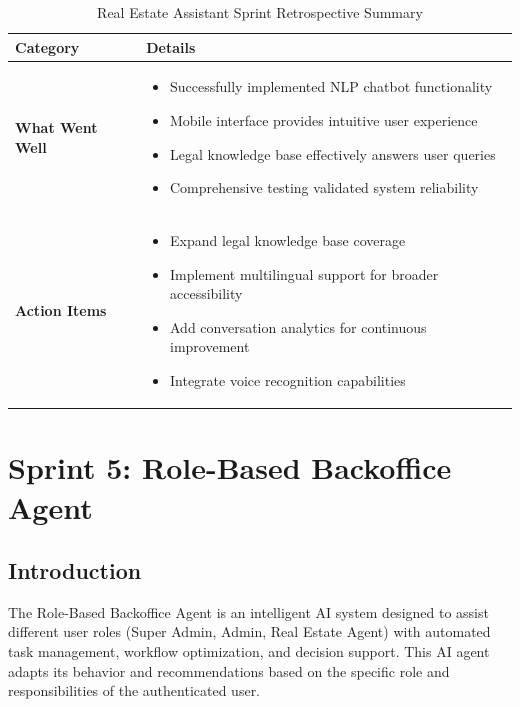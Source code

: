 \begin{table}[htbp]
    \centering
    \begin{tabular}{|p{3cm}|p{10cm}|}
        \hline
        \textbf{Category} & \textbf{Details} \\
        \hline
        \textbf{What Went Well} & 
        \begin{itemize}
            \item Successfully implemented NLP chatbot functionality
            \item Mobile interface provides intuitive user experience
            \item Legal knowledge base effectively answers user queries
            \item Comprehensive testing validated system reliability
        \end{itemize} \\
        \hline
        \textbf{Action Items} & 
        \begin{itemize}
            \item Expand legal knowledge base coverage
            \item Implement multilingual support for broader accessibility
            \item Add conversation analytics for continuous improvement
            \item Integrate voice recognition capabilities
        \end{itemize} \\
        \hline
    \end{tabular}
    \caption{Real Estate Assistant Sprint Retrospective Summary}
    \label{tab:assistant-retrospective}
\end{table}

\newpage

\section{Sprint 5: Role-Based Backoffice Agent}
\subsection*{Introduction}
The Role-Based Backoffice Agent is an intelligent AI system designed to assist different user roles (Super Admin, Admin, Real Estate Agent) with automated task management, workflow optimization, and decision support. This AI agent adapts its behavior and recommendations based on the specific role and responsibilities of the authenticated user.

